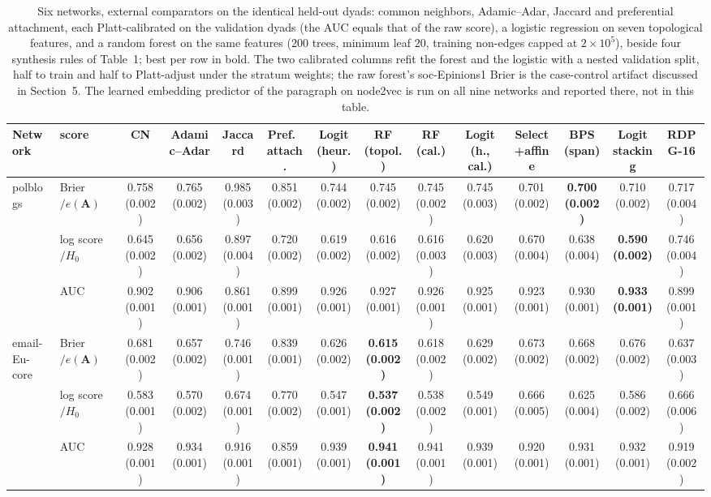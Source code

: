 \documentclass[12pt]{article}
\begin{document}
\begin{table}[ht]
\centering
\caption{Six networks, external comparators on the identical held-out dyads: common neighbors, Adamic--Adar, Jaccard and preferential attachment, each Platt-calibrated on the validation dyads (the AUC equals that of the raw score), a logistic regression on seven topological features, and a random forest on the same features ($200$ trees, minimum leaf $20$, training non-edges capped at $2\times10^5$), beside four synthesis rules of Table~1; best per row in bold. The two calibrated columns refit the forest and the logistic with a nested validation split, half to train and half to Platt-adjust under the stratum weights; the raw forest's soc-Epinions1 Brier is the case-control artifact discussed in Section~5. The learned embedding predictor of the paragraph on node2vec is run on all nine networks and reported there, not in this table.}
\label{tab:external}
\begin{tabular}{llcccccccccccc}
\toprule
Network & score & CN & Adamic--Adar & Jaccard & Pref.\ attach. & Logit (heur.) & RF (topol.) & RF (cal.) & Logit (h., cal.) & Select+affine & BPS (span) & Logit stacking & RDPG-16 \\
\midrule
polblogs & Brier$/e(\mathbf{A})$ & 0.758 (0.002) & 0.765 (0.002) & 0.985 (0.003) & 0.851 (0.002) & 0.744 (0.002) & 0.745 (0.002) & 0.745 (0.002) & 0.745 (0.003) & 0.701 (0.002) & \textbf{0.700 (0.002)} & 0.710 (0.002) & 0.717 (0.004) \\
 & log score$/H_0$ & 0.645 (0.002) & 0.656 (0.002) & 0.897 (0.004) & 0.720 (0.002) & 0.619 (0.002) & 0.616 (0.002) & 0.616 (0.003) & 0.620 (0.003) & 0.670 (0.004) & 0.638 (0.004) & \textbf{0.590 (0.002)} & 0.746 (0.004) \\
 & AUC & 0.902 (0.001) & 0.906 (0.001) & 0.861 (0.001) & 0.899 (0.001) & 0.926 (0.001) & 0.927 (0.001) & 0.926 (0.001) & 0.925 (0.001) & 0.923 (0.001) & 0.930 (0.001) & \textbf{0.933 (0.001)} & 0.899 (0.001) \\
email-Eu-core & Brier$/e(\mathbf{A})$ & 0.681 (0.002) & 0.657 (0.002) & 0.746 (0.001) & 0.839 (0.001) & 0.626 (0.002) & \textbf{0.615 (0.002)} & 0.618 (0.002) & 0.629 (0.002) & 0.673 (0.002) & 0.668 (0.002) & 0.676 (0.002) & 0.637 (0.003) \\
 & log score$/H_0$ & 0.583 (0.001) & 0.570 (0.002) & 0.674 (0.001) & 0.770 (0.002) & 0.547 (0.001) & \textbf{0.537 (0.002)} & 0.538 (0.002) & 0.549 (0.001) & 0.666 (0.005) & 0.625 (0.004) & 0.586 (0.002) & 0.666 (0.006) \\
 & AUC & 0.928 (0.001) & 0.934 (0.001) & 0.916 (0.001) & 0.859 (0.001) & 0.939 (0.001) & \textbf{0.941 (0.001)} & 0.941 (0.001) & 0.939 (0.001) & 0.920 (0.001) & 0.931 (0.001) & 0.932 (0.001) & 0.919 (0.002) \\

\end{tabular}
\end{table}
\end{document}
